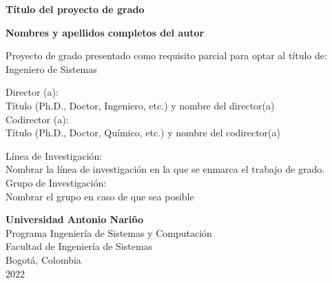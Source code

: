 \begin{titlepage}
    \begin{center}
        \vspace*{1cm}

        \Huge
        \textbf{Título del proyecto de grado}
 
        \vfill
        
        \large
        \textbf{Nombres y apellidos completos del autor}\\
 
        \vfill

        Proyecto de grado presentado como requisito parcial para optar al título de:\\
        Ingeniero de Sistemas\\

        \vfill

        Director (a):\\
        Título (Ph.D., Doctor, Ingeniero, etc.) y nombre del director(a)\\
        Codirector (a):\\
        Título (Ph.D., Doctor, Químico, etc.) y nombre del codirector(a)\\

        \vfill

        Línea de Investigación:\\
        Nombrar la línea de investigación en la que se enmarca el trabajo de grado.\\
        Grupo de Investigación:\\
        Nombrar el grupo en caso de que sea posible\\

             
        \vspace{0.8cm}
             
        \textbf{Universidad Antonio Nariño}\\
        Programa Ingeniería de Sistemas y Computación\\
        Facultad de Ingeniería de Sistemas\\
        Bogotá, Colombia\\
        2022
    \end{center}
\end{titlepage}
